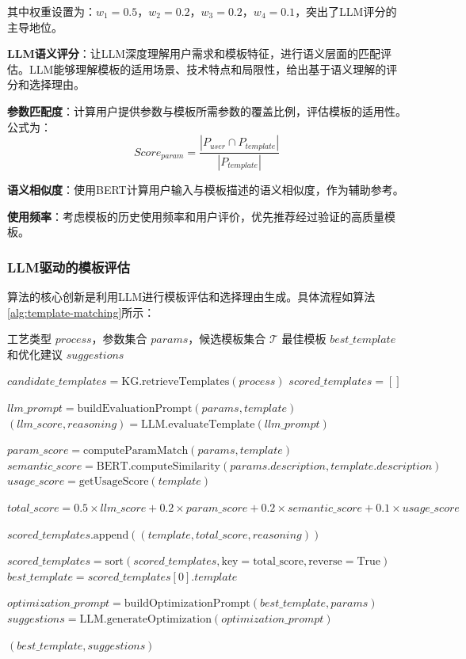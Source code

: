 \documentclass[preprint,12pt]{elsarticle}
\begin{document}
其中权重设置为：$w_1 = 0.5$，$w_2 = 0.2$，$w_3 = 0.2$，$w_4 = 0.1$，突出了LLM评分的主导地位。

\textbf{LLM语义评分}：让LLM深度理解用户需求和模板特征，进行语义层面的匹配评估。LLM能够理解模板的适用场景、技术特点和局限性，给出基于语义理解的评分和选择理由。

\textbf{参数匹配度}：计算用户提供参数与模板所需参数的覆盖比例，评估模板的适用性。公式为：
\begin{equation}
Score_{param} = \frac{|P_{user} \cap P_{template}|}{|P_{template}|}
\end{equation}

\textbf{语义相似度}：使用BERT计算用户输入与模板描述的语义相似度，作为辅助参考。

\textbf{使用频率}：考虑模板的历史使用频率和用户评价，优先推荐经过验证的高质量模板。

\subsubsection{LLM驱动的模板评估}

算法的核心创新是利用LLM进行模板评估和选择理由生成。具体流程如算法\ref{alg:template-matching}所示：

\begin{algorithm}[htbp]
\caption{LLM主导的模板匹配算法}
\label{alg:template-matching}
\begin{algorithmic}[1]
\Require 工艺类型 $process$，参数集合 $params$，候选模板集合 $\mathcal{T}$
\Ensure 最佳模板 $best\_template$ 和优化建议 $suggestions$

\State $candidate\_templates = \text{KG.retrieveTemplates}(process)$
\State $scored\_templates = []$

    \State $llm\_prompt = \text{buildEvaluationPrompt}(params, template)$
    \State $(llm\_score, reasoning) = \text{LLM.evaluateTemplate}(llm\_prompt)$
    
    \State $param\_score = \text{computeParamMatch}(params, template)$
    \State $semantic\_score = \text{BERT.computeSimilarity}(params.description, template.description)$
    \State $usage\_score = \text{getUsageScore}(template)$
    
    \State $total\_score = 0.5 \times llm\_score + 0.2 \times param\_score + 0.2 \times semantic\_score + 0.1 \times usage\_score$
    
    \State $scored\_templates.\text{append}((template, total\_score, reasoning))$
\EndFor

\State $scored\_templates = \text{sort}(scored\_templates, \text{key}=\text{total\_score}, \text{reverse}=\text{True})$
\State $best\_template = scored\_templates[0].template$

\State $optimization\_prompt = \text{buildOptimizationPrompt}(best\_template, params)$
\State $suggestions = \text{LLM.generateOptimization}(optimization\_prompt)$

\Return $(best\_template, suggestions)$
\end{algorithmic}
\end{algorithm}
\end{document}
